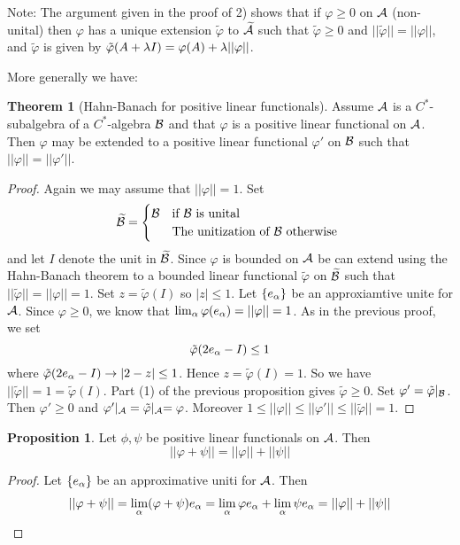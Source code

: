 \documentclass[10pt,english,a4paper]{article}
\theoremstyle{definition}
\newtheorem*{theorem}{Theorem}
\newtheorem*{proposition}{Proposition}
\def\tAs{\widetilde{\As}}
\def\tBs{\widetilde{\Bs}}
\def\tvphi{\tilde{\varphi}}
\def\vphi{\varphi}
\begin{document}
Note:
The argument given in the proof of 2) shows that if $\varphi \geq 0$ on $\mathcal{A}$ 
(non-unital) then $\varphi$ has a unique extension $\tvphi$ to $\tAs$ such that 
$\tvphi\geq 0$ and $||\tvphi|| = ||\vphi||$, and $\tvphi$ is given by
$\tvphi(A + \la I) = \vphi(A) + \la ||\vphi||$. 

More generally we have:  

\begin{theorem}[Hahn-Banach for positive linear functionals]
   Assume $\mathcal{A}$ is a $C^*$-subalgebra of a $C^*$-algebra $\mathcal{B}$ and that 
$\vphi$ is a positive linear functional on $\mathcal{A}$. Then $\varphi$ may be 
extended to a positive linear functional $\vphi'$ on $\mathcal{B}$ such that 
$||\vphi|| = ||\vphi'||$.
\end{theorem}

\begin{proof}
    Again we may assume that $||\vphi||=1$. Set 
\[ \widetilde{\mathcal{B}} = \begin{cases} \mathcal{B} &\text{if $\mathcal{B}$ is unital}\\ &\text{The unitization of $\mathcal{B}$ otherwise } \end{cases}\]
and let $I$ denote the unit in $\tBs$.
Since $\vphi$ is bounded on $\mathcal{A}$ be can extend using the Hahn-Banach theorem 
to a bounded linear functional $\tvphi$ on $\tBs$ such that $||\tvphi|| =
||\vphi|| = 1$. Set $z = \tvphi(I)$ so $|z| \leq 1$. Let $\{e_{\alpha}\}$ be an 
approxiamtive unite for $\mathcal{A}$. Since $\vphi \geq 0$, we know that $\lim_{\al} \vphi(e_{\al}) = ||\vphi|| = 1$. As in the previous proof, we set 
\[\tvphi(2e_{\al} - I) \leq 1\]
where $\tvphi(2e_{\al} - I) \to |2-z|\leq 1 $. Hence 
$z = \tvphi(I) = 1$. So we have $||\tvphi|| = 1 = \tvphi(I)$. Part (1) of the previous proposition
gives $\tvphi\geq 0$.
Set $\vphi' = \tvphi\lvert_{\Bs}$. Then $\vphi'\geq 0$ and 
$\vphi'\vert_{\As} = \tvphi\lvert_{\As}  = \vphi$. Moreover 
$1 \leq ||\vphi|| \leq ||\vphi'|| \leq ||\tvphi|| =1$.
\end{proof}

\begin{proposition}
    Let $\phi, \psi$ be positive linear functionals on $\mathcal{A}$. Then 
    \[ ||\vphi +\psi || = ||\vphi|| + ||\psi|| \]
\end{proposition}
\begin{proof}
    Let $\{e_{\alpha}\}$ be an approximative uniti for $\mathcal{A}$. Then 
    \begin{align*}
        ||\vphi +\psi|| = \lim_{\al} (\vphi+\psi)e_{\al} = \lim_{\al}\vphi e_{\al}
        + \lim_{\al} \psi e_{\al} = ||\vphi ||+||\psi||
    \end{align*}    
\end{proof}
\end{document}
